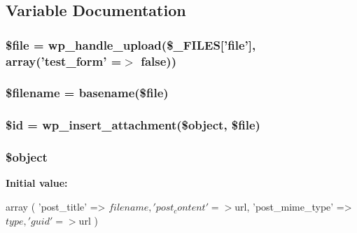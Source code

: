 \subsection{Variable Documentation}
\hypertarget{settings__ajax_8php_aa1bfbd27060176201b271918dff57e8f}{
\subsubsection[{\$file}]{\setlength{\rightskip}{0pt plus 5cm}\$file = wp\_\-handle\_\-upload(\$\_\-FILES\mbox{[}'file'\mbox{]}, array('test\_\-form' =$>$ false))}}
\label{d5/d83/settings__ajax_8php_aa1bfbd27060176201b271918dff57e8f}
\hypertarget{settings__ajax_8php_a0722441477f957078ee2437054556cbc}{
\subsubsection[{\$filename}]{\setlength{\rightskip}{0pt plus 5cm}\$filename = basename(\$file)}}
\label{d5/d83/settings__ajax_8php_a0722441477f957078ee2437054556cbc}
\hypertarget{settings__ajax_8php_ae97941710d863131c700f069b109991e}{
\subsubsection[{\$id}]{\setlength{\rightskip}{0pt plus 5cm}\$id = wp\_\-insert\_\-attachment(\$object, \$file)}}
\label{d5/d83/settings__ajax_8php_ae97941710d863131c700f069b109991e}
\hypertarget{settings__ajax_8php_a52123b83a1952a68c5513e47d59ec4a6}{
\subsubsection[{\$object}]{\setlength{\rightskip}{0pt plus 5cm}\$object}}
\label{d5/d83/settings__ajax_8php_a52123b83a1952a68c5513e47d59ec4a6}
{\bfseries Initial value:}
\begin{DoxyCode}
 
    array
    (
        'post_title' => $filename,
        'post_content' => $url,
        'post_mime_type' => $type,
        'guid' => $url
    )
\end{DoxyCode}
